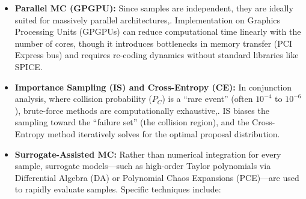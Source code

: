 \documentclass[
  letterpaper,
  DIV=11,
  numbers=noendperiod,
  oneside]{scrartcl}
\begin{document}
\begin{itemize}
\item
  \textbf{Parallel MC (GPGPU):} Since samples are independent, they are
  ideally suited for massively parallel architectures,. Implementation
  on Graphics Processing Units (GPGPUs) can reduce computational time
  linearly with the number of cores, though it introduces bottlenecks in
  memory transfer (PCI Express bus) and requires re-coding dynamics
  without standard libraries like SPICE.
\item
  \textbf{Importance Sampling (IS) and Cross-Entropy (CE):} In
  conjunction analysis, where collision probability (\(P_C\)) is a
  ``rare event'' (often \(10^{-4}\) to \(10^{-6}\)), brute-force methods
  are computationally exhaustive,. IS biases the sampling toward the
  ``failure set'' (the collision region), and the Cross-Entropy method
  iteratively solves for the optimal proposal distribution.
\item
  \textbf{Surrogate-Assisted MC:} Rather than numerical integration for
  every sample, surrogate models---such as high-order Taylor polynomials
  via Differential Algebra (DA) or Polynomial Chaos Expansions
  (PCE)---are used to rapidly evaluate samples. Specific techniques
  include:


\end{itemize}
\end{document}
